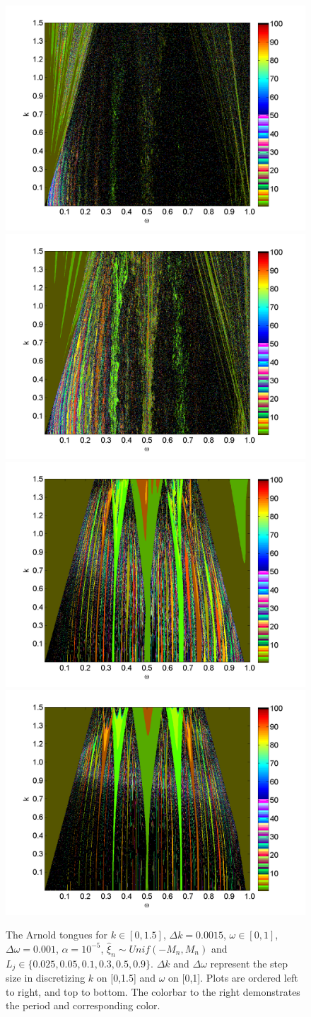 \begin{figure}[H]\linespread{1}  
\caption[The Arnold tongues for the random circle map, uniform
distribution, $\alpha = \frac{1}{2}10^{-5}$]{The Arnold
  tongues for $k\in [0,1.5]$, $\Delta k = 0.0015$, $\omega \in [0,1]$,
  $\Delta \omega = 0.001$, $\alpha = 10^{-5}$, $\hat{\xi}_n\sim Unif(-M_n,M_n)$ and $L_j \in
  \{0.025,0.05,0.1,0.3,0.5,0.9\}$. $\Delta k$ and $\Delta \omega$
  represent the step size in discretizing $k$ on [0,1.5] and $\omega$
  on [0,1]. Plots are ordered left to right,
  and top to bottom. The colorbar to the right demonstrates the period and corresponding color.}\label{fig:rcirctongues_u_ha}
\centering
\includegraphics[width=.5\textwidth]{figs/tongues_u_halfa_1000_L_0025.png}\hfill
\includegraphics[width=.5\textwidth]{figs/tongues_u_halfa_1000_L_005.png}\\
\includegraphics[width=.5\textwidth]{figs/tongues_u_halfa_1000_L_03.png}\hfill
\includegraphics[width=.5\textwidth]{figs/tongues_u_halfa_1000_L_05.png}\\

\end{figure}
